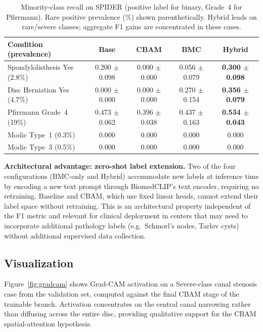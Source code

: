 \documentclass[conference]{IEEEtran}
\newcommand{\best}[1]{\textcolor{best}{\textbf{#1}}}
\begin{document}
\begin{table}[t]
\centering
\caption{Minority-class recall on SPIDER (positive label for binary,
Grade~4 for Pfirrmann). Rare positive prevalence (\%) shown
parenthetically. Hybrid leads on rare/severe classes; aggregate F1
gains are concentrated in these cases.}
\label{tab:spider_minority}
\renewcommand{\arraystretch}{1.05}
\footnotesize
\begin{tabular}{@{}lcccc@{}}
\toprule
Condition (prevalence)              & Base   & CBAM   & BMC    & Hybrid \\
\midrule
Spondylolisthesis Yes (2.8\%)       & 0.200 $\pm$ 0.098 & 0.000 $\pm$ 0.000 & 0.056 $\pm$ 0.079 & \best{0.300 $\pm$ 0.098} \\
Disc Herniation Yes (4.7\%)         & 0.000 $\pm$ 0.000 & 0.000 $\pm$ 0.000 & 0.270 $\pm$ 0.154 & \best{0.356 $\pm$ 0.079} \\
Pfirrmann Grade~4 (19\%)            & 0.473 $\pm$ 0.062 & 0.396 $\pm$ 0.038 & 0.437 $\pm$ 0.163 & \best{0.534 $\pm$ 0.043} \\
Modic Type~1 (0.3\%)                & 0.000  & 0.000  & 0.000  & 0.000 \\
Modic Type~3 (0.5\%)                & 0.000  & 0.000  & 0.000  & 0.000 \\
\bottomrule
\end{tabular}
\end{table}

\textbf{Architectural advantage: zero-shot label extension.} Two of
the four configurations (BMC-only and Hybrid) accommodate new labels
at inference time by encoding a new text prompt through BiomedCLIP's
text encoder, requiring no retraining. Baseline and CBAM, which use
fixed linear heads, cannot extend their label space without retraining.
This is an architectural property independent of the F1 metric and
relevant for clinical deployment in centers that may need to
incorporate additional pathology labels (e.g.\ Schmorl's nodes,
Tarlov cysts) without additional supervised data collection.

\subsection{Visualization}

Figure~\ref{fig:gradcam} shows Grad-CAM activation on a Severe-class
canal stenosis case from the validation set, computed against the
final CBAM stage of the trainable branch. Activation concentrates on
the central canal narrowing rather than diffusing across the entire
disc, providing qualitative support for the CBAM spatial-attention
hypothesis.
\end{document}
